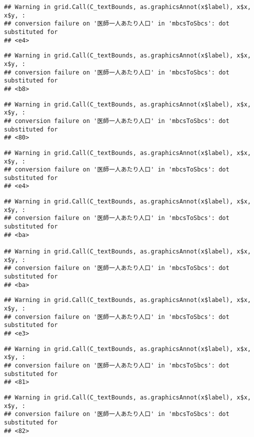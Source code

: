 \documentclass[
]{article}
\begin{document}
\begin{verbatim}
## Warning in grid.Call(C_textBounds, as.graphicsAnnot(x$label), x$x, x$y, :
## conversion failure on '医師一人あたり人口' in 'mbcsToSbcs': dot substituted for
## <e4>
\end{verbatim}

\begin{verbatim}
## Warning in grid.Call(C_textBounds, as.graphicsAnnot(x$label), x$x, x$y, :
## conversion failure on '医師一人あたり人口' in 'mbcsToSbcs': dot substituted for
## <b8>
\end{verbatim}

\begin{verbatim}
## Warning in grid.Call(C_textBounds, as.graphicsAnnot(x$label), x$x, x$y, :
## conversion failure on '医師一人あたり人口' in 'mbcsToSbcs': dot substituted for
## <80>
\end{verbatim}

\begin{verbatim}
## Warning in grid.Call(C_textBounds, as.graphicsAnnot(x$label), x$x, x$y, :
## conversion failure on '医師一人あたり人口' in 'mbcsToSbcs': dot substituted for
## <e4>
\end{verbatim}

\begin{verbatim}
## Warning in grid.Call(C_textBounds, as.graphicsAnnot(x$label), x$x, x$y, :
## conversion failure on '医師一人あたり人口' in 'mbcsToSbcs': dot substituted for
## <ba>

## Warning in grid.Call(C_textBounds, as.graphicsAnnot(x$label), x$x, x$y, :
## conversion failure on '医師一人あたり人口' in 'mbcsToSbcs': dot substituted for
## <ba>
\end{verbatim}

\begin{verbatim}
## Warning in grid.Call(C_textBounds, as.graphicsAnnot(x$label), x$x, x$y, :
## conversion failure on '医師一人あたり人口' in 'mbcsToSbcs': dot substituted for
## <e3>
\end{verbatim}

\begin{verbatim}
## Warning in grid.Call(C_textBounds, as.graphicsAnnot(x$label), x$x, x$y, :
## conversion failure on '医師一人あたり人口' in 'mbcsToSbcs': dot substituted for
## <81>
\end{verbatim}

\begin{verbatim}
## Warning in grid.Call(C_textBounds, as.graphicsAnnot(x$label), x$x, x$y, :
## conversion failure on '医師一人あたり人口' in 'mbcsToSbcs': dot substituted for
## <82>
\end{verbatim}
\end{document}
